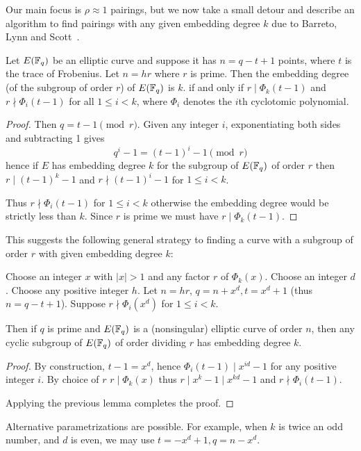 Our main focus is $\rho \approx 1$ pairings, but we now take a small detour
and describe an algorithm to find
pairings with any given embedding degree $k$ due to Barreto, Lynn and Scott~\cite{bals}.

\begin{lemma}
Let $E(\mathbb{F}_q)$ be an elliptic curve and suppose it has
$n = q - t + 1$ points, where $t$ is the trace of Frobenius.
Let $n = h r$ where $r$ is prime.
Then the embedding degree (of the subgroup of order $r$) of $E(\mathbb{F}_q)$ is $k$.
if and only if
$r \mid \Phi_k(t-1)$ and $r \nmid \Phi_i(t-1)$ for all $1 \le i < k$,
where $\Phi_i$ denotes the $i$th cyclotomic polynomial.
\end{lemma}

\begin{proof}
Then $q = t - 1 \pmod r$. Given any integer $i$, exponentiating both sides
and subtracting 1 gives
\[ q^i - 1 = (t-1)^i -1 \pmod r \]
hence if $E$ has embedding degree $k$ for the subgroup of $E(\mathbb{F}_q)$ of order $r$
then $r \mid (t-1)^k - 1$ and $r \nmid (t-1)^i - 1$ for $1 \le i < k$.

Thus $r \nmid \Phi_i(t-1)$ for $1 \le i < k$ otherwise the embedding degree
would be strictly less than $k$. Since $r$ is prime we must have
$r \mid \Phi_k(t-1)$.
\end{proof}

This suggests the following general strategy to finding a curve with
a subgroup of order $r$ with given embedding degree $k$:

\begin{theorem}
Choose an integer $x$ with $|x| > 1$ and any factor $r$ of
$\Phi_k(x)$.
Choose an integer $d$.
Choose any positive integer $h$. Let $n = hr$, $q = n + x^d, t = x^d + 1$
(thus $n = q - t + 1$).
Suppose $r \nmid \Phi_i(x^d)$ for $1 \le i < k$.

Then if $q$ is prime and $E(\mathbb{F}_q)$ is a (nonsingular)
elliptic curve of order $n$, then
any cyclic subgroup of $E(\mathbb{F}_q)$ of order dividing
$r$ has embedding degree $k$.
\end{theorem}

\begin{proof}
By construction, $t-1 = x^d$, hence $\Phi_i(t-1) \mid x^{id} - 1$ for
any positive integer $i$.
By choice of $r$
$r \mid \Phi_k(x)$ thus $r \mid x^k - 1 \mid x^{kd} - 1$ and
$r \nmid \Phi_i(t-1)$.

Applying the previous lemma completes the proof.
\end{proof}

Alternative parametrizations are possible. For example, when $k$ is twice
an odd number, and $d$ is even, we may use $t = -x^d + 1, q = n - x^d$.

